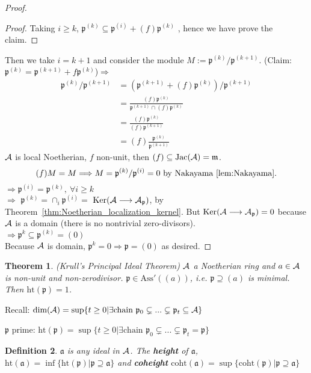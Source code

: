 \documentclass[11pt]{article}
\newtheorem{thm}{Theorem}[section]
\newtheorem{dfn}[thm]{Definition}
\newcommand{\sca}{{\mathfrak a}}
\newcommand{\scm}{{\mathfrak m}}
\newcommand{\scp}{{\mathfrak p}}
\newcommand{\cala}{{\cal A}}
\newcommand{\Lrta}{\Longrightarrow}
\newcommand{\lrta}{\longrightarrow}
\begin{document}
\begin{proof}
\begin{proof}
Taking $i\geq k$,
$
\scp^{(k)}\subseteq\scp^{(i)}+(f)\scp^{(k)}
$
, hence we have prove the claim.
\end{proof}

Then we take $i=k+1$ and consider the module $M:=\scp^{(k)}/\scp^{(k+1)}$.
(Claim:$\scp^{(k)}=\scp^{(k+1)}+f\scp^{(k)}$)$\Lrta$ 
$$
\begin{aligned}
\scp^{(k)}/\scp^{(k+1)}&=(\scp^{(k+1)}+(f)\scp^{(k)})/\scp^{(k+1)}\\
&=\frac{(f)\scp^{(k)}}{\scp^{(k+1)}\cap (f)\scp^{(k)}}\\
&=\frac{(f)\scp^{(k)}}{(f)\scp^{(k+1)}}\\
&=(f)\frac{\scp^{(k)}}{\scp^{(k+1)}}
\end{aligned}
$$
$\cala$ is local Noetherian, $f$ non-unit, then
$(f)\subseteq \text{Jac}(\cala)=\scm$.
$$
(f)M=M\Lrta M=\scp^{(k)}/\scp^{(i)}=0\text{ by Nakayama~\ref{lem:Nakayama}}.\\
$$
$\Lrta\scp^{(i)}=\scp^{(k)},\ \forall i\geq k$\\
$\Lrta$ $\scp^{(k)}=\cap_i\scp^{(i)}=$  $\text{Ker}(\cala\lrta \cala_\scp)$, by Theorem~\ref{thm:Noetherian_localization_kernel}. 
But $\text{Ker}(\cala\lrta \cala_\scp)={0}$ because $\cala$ is a domain (there is no nontrivial zero-divisors).\\
$\Lrta \scp^k\subseteq\scp^{(k)}=(0)$\\
Because $\cala$ is domain, $\scp^{k}=0\Lrta\scp=(0)$ as desired.
\end{proof}

\begin{thm}\label{thm:krull_principal}
(Krull's Principal Ideal Theorem) $\cala$ a Noetherian ring and $a\in \cala$ is non-unit and non-zerodivisor.
$\scp\in \text{Ass}'((a))$, i.e. $\scp\supseteq (a)$ is minimal. Then $\text{ht}(\scp)=1$.
\end{thm}
Recall: $\text{dim}(\cala)=\sup\{t\geq 0|\exists \text{chain } \scp_0\subsetneq...\subsetneq \scp_t\subseteq \cala\}$

$\scp$ prime: $\text{ht}(\scp)=\sup\{t\geq 0|\exists \text{chain } \scp_0\subsetneq...\subsetneq \scp_t=\scp\}$
\begin{dfn}$\sca$ is any ideal in $\cala$. The \textbf{height} of $\sca$, $\text{ht}(\sca)=\inf\{\text{ht}(\scp)|\scp\supseteq\sca\}$
 and \textbf{coheight} $\text{coht}(\sca)=\sup\{\text{coht}(\scp)|\scp\supseteq \sca\}$
\end{dfn}
\end{document}
